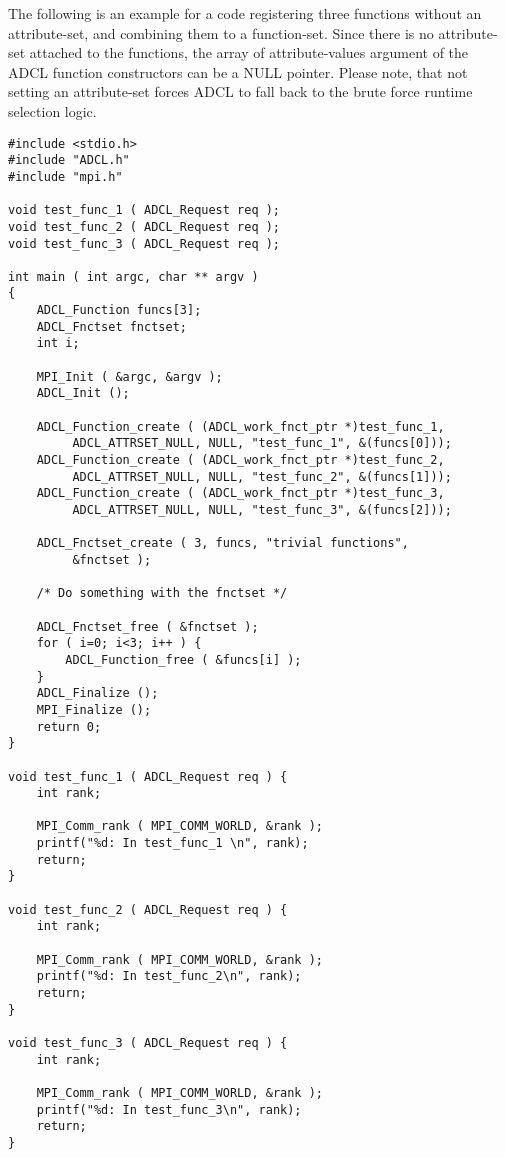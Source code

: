 The following is an example for a code registering three functions without an
attribute-set, and combining them to a function-set. Since there is no
attribute-set attached to the functions, the array of attribute-values
argument of the ADCL function constructors can be a NULL pointer. Please note,
that not setting an attribute-set forces ADCL to fall back to the brute force
runtime selection logic.
\begin{verbatim}
#include <stdio.h>
#include "ADCL.h"
#include "mpi.h"

void test_func_1 ( ADCL_Request req );
void test_func_2 ( ADCL_Request req );
void test_func_3 ( ADCL_Request req );

int main ( int argc, char ** argv ) 
{
    ADCL_Function funcs[3];
    ADCL_Fnctset fnctset;
    int i;
        
    MPI_Init ( &argc, &argv );
    ADCL_Init ();

    ADCL_Function_create ( (ADCL_work_fnct_ptr *)test_func_1, 
         ADCL_ATTRSET_NULL, NULL, "test_func_1", &(funcs[0]));
    ADCL_Function_create ( (ADCL_work_fnct_ptr *)test_func_2, 
         ADCL_ATTRSET_NULL, NULL, "test_func_2", &(funcs[1]));
    ADCL_Function_create ( (ADCL_work_fnct_ptr *)test_func_3, 
         ADCL_ATTRSET_NULL, NULL, "test_func_3", &(funcs[2]));

    ADCL_Fnctset_create ( 3, funcs, "trivial functions", 
         &fnctset );

    /* Do something with the fnctset */
    
    ADCL_Fnctset_free ( &fnctset );
    for ( i=0; i<3; i++ ) {
      	ADCL_Function_free ( &funcs[i] );
    }    
    ADCL_Finalize ();
    MPI_Finalize ();
    return 0;
}

void test_func_1 ( ADCL_Request req ) {
    int rank;
    
    MPI_Comm_rank ( MPI_COMM_WORLD, &rank );
    printf("%d: In test_func_1 \n", rank);
    return;
}

void test_func_2 ( ADCL_Request req ) {
    int rank;
    
    MPI_Comm_rank ( MPI_COMM_WORLD, &rank );
    printf("%d: In test_func_2\n", rank);
    return;
}

void test_func_3 ( ADCL_Request req ) {
    int rank;
    
    MPI_Comm_rank ( MPI_COMM_WORLD, &rank ); 
    printf("%d: In test_func_3\n", rank);
    return;
}

\end{verbatim}

